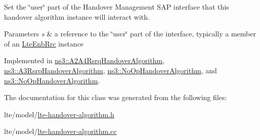 Set the \char`\"{}user\char`\"{} part of the Handover Management S\+AP interface that this handover algorithm instance will interact with. 


\begin{DoxyParams}{Parameters}
{\em s} & a reference to the \char`\"{}user\char`\"{} part of the interface, typically a member of an \hyperlink{classns3_1_1LteEnbRrc}{Lte\+Enb\+Rrc} instance \\
\hline
\end{DoxyParams}


Implemented in \hyperlink{classns3_1_1A2A4RsrqHandoverAlgorithm_aa0800422eef0bbf24cd4a38991973fe0}{ns3\+::\+A2\+A4\+Rsrq\+Handover\+Algorithm}, \hyperlink{classns3_1_1A3RsrpHandoverAlgorithm_ae3bbe08d5f94370dc025984ced30484d}{ns3\+::\+A3\+Rsrp\+Handover\+Algorithm}, \hyperlink{classns3_1_1NoOpHandoverAlgorithm_a0d07ba908a911ec57e5b55ff8518cbe8}{ns3\+::\+No\+Op\+Handover\+Algorithm}, and \hyperlink{classns3_1_1NoOpHandoverAlgorithm_a571693f73b55e2b865adaf0a1a1ee612}{ns3\+::\+No\+Op\+Handover\+Algorithm}.



The documentation for this class was generated from the following files\+:\begin{DoxyCompactItemize}
\item 
lte/model/\hyperlink{lte-handover-algorithm_8h}{lte-\/handover-\/algorithm.\+h}\item 
lte/model/\hyperlink{lte-handover-algorithm_8cc}{lte-\/handover-\/algorithm.\+cc}\end{DoxyCompactItemize}
